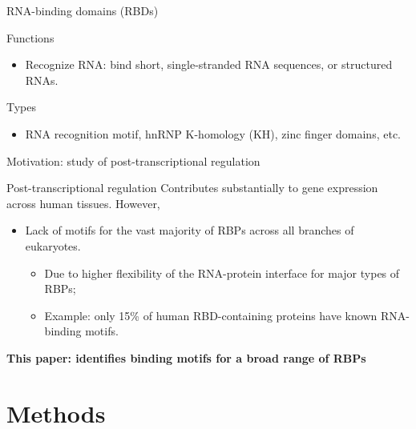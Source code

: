 \documentclass[professionalfont, 12pt, default]{beamer}
\providecommand{\tightlist}{%
    \setlength{\itemsep}{0pt}\setlength{\parskip}{0pt}}
\begin{document}
\begin{frame}{%
\protect\hypertarget{rna-binding-domains-rbds}{%
RNA-binding domains (RBDs)}}

\begin{block}{Functions}

\begin{itemize}
\tightlist
\item
  Recognize RNA: bind short, single-stranded RNA sequences, or
  structured RNAs.
\end{itemize}

\end{block}

\begin{block}{Types}

\begin{itemize}
\tightlist
\item
  RNA recognition motif, hnRNP K-homology (KH), zinc finger domains,
  etc.
\end{itemize}

\end{block}

\end{frame}

\begin{frame}{%
\protect\hypertarget{motivation-study-of-post-transcriptional-regulation}{%
Motivation: study of post-transcriptional regulation}}

Post-transcriptional regulation Contributes substantially to gene
expression across human tissues. However,

\begin{itemize}
\tightlist
\item
  Lack of motifs for the vast majority of RBPs across all branches of
  eukaryotes.

  \begin{itemize}
  \tightlist
  \item
    Due to higher flexibility of the RNA-protein interface for major
    types of RBPs;
  \item
    Example: only 15\% of human RBD-containing proteins have known
    RNA-binding motifs.
  \end{itemize}
\end{itemize}

\textbf{This paper: identifies binding motifs for a broad range of RBPs}

\end{frame}

\hypertarget{methods}{%
\section{Methods}\label{methods}}
\end{document}
